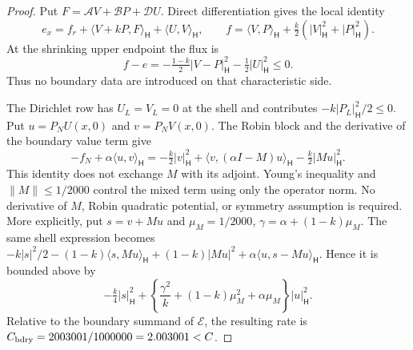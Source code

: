 \documentclass[11pt]{article}
\newcommand{\norm}[1]{\lVert #1\rVert}
\newcommand{\HH}{\mathsf H}
\newcommand{\ip}[2]{\langle #1,#2\rangle_{\HH}}
\newcommand{\PN}{P_N}
\begin{document}
\begin{proof}
Put $F=\mathcal A V+\mathcal B P+\mathcal D U$. Direct differentiation
gives the local identity
\begin{equation}
 e_x=f_r+\ip{V+kP}{F}+\ip{U}{V},\qquad
 f=\ip{V}{P}+\tfrac k2(|V|_{\HH}^2+|P|_{\HH}^2).
 \label{eq:flux}
\end{equation}
At the shrinking upper endpoint the flux is
\begin{equation}
 f-e=-\tfrac{1-k}{2}|V-P|_{\HH}^2-\tfrac12|U|_{\HH}^2\le0.
 \label{eq:upperflux}
\end{equation}
Thus no boundary data are introduced on that characteristic side.

The Dirichlet row has $U_L=V_L=0$ at the shell and contributes
$-k|P_L|_{\HH}^2/2\le0$. Put $u=\PN U(x,0)$ and $v=\PN V(x,0)$.
The Robin block and the derivative of the boundary value term give
\begin{equation}
 -f_N+\alpha\ip{u}{v}
 =-\tfrac k2|v|_{\HH}^2+\ip{v}{(\alpha I-M)u}
                           -\tfrac k2|Mu|_{\HH}^2.
 \label{eq:Robinflux}
\end{equation}
This identity does not exchange $M$ with its adjoint. Young's inequality
and $\norm{M}\le1/2000$ control the mixed term using only the operator
norm. No derivative of $M$, Robin quadratic potential, or symmetry
assumption is required.
More explicitly, put $s=v+Mu$ and
$\mu_M=1/2000$, $\gamma=\alpha+(1-k)\mu_M$.
The same shell expression becomes
$-k|s|^2/2-(1-k)\ip{s}{Mu}+(1-k)|Mu|^2
+\alpha\ip{u}{s-Mu}$. Hence it is bounded above by
\begin{equation}
 -\tfrac k4|s|_{\HH}^2+
 \left\{\frac{\gamma^2}{k}+(1-k)\mu_M^2+\alpha\mu_M\right\}|u|_{\HH}^2.
 \label{eq:Robinabsorb}
\end{equation}
Relative to the boundary summand of $\mathcal E$, the resulting rate is
$C_{\rm bdry}=2003001/1000000=2.003001<C$.


\end{proof}
\end{document}
